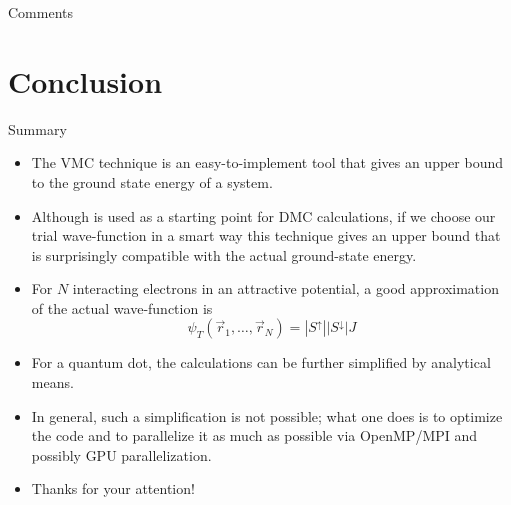 \documentclass[10pt, compress, usetitleprogressbar, protectframetitle, handout]{beamer}
\begin{document}
\begin{versionLONG}
\begin{frame}{Comments}
\end{frame}

\end{versionLONG}

\section{Conclusion}

\begin{frame}{Summary}

	\begin{itemize}[<+->]
		\item The VMC technique is an easy-to-implement tool that gives an upper bound to the ground state energy of a system.
		\item Although is used as a starting point for DMC calculations, if we choose our trial wave-function in a smart way this technique gives an upper bound that is surprisingly compatible with the actual ground-state energy.
		\item For $N$ interacting electrons in an attractive potential, a good approximation of the actual wave-function is
		\begin{equation*}
			\psi_T(\vec{r}_1,\ldots,\vec{r}_N) = |S^{\uparrow}||S^{\downarrow}|J
		\end{equation*}
		\item For a quantum dot, the calculations can be further simplified by analytical means.
		\item In general, such a simplification is not possible; what one does is to optimize the code and to parallelize it as much as possible via OpenMP/MPI and possibly GPU parallelization.
		\item \alert{Thanks for your attention!}
	\end{itemize}
	

\end{frame}

\end{document}
